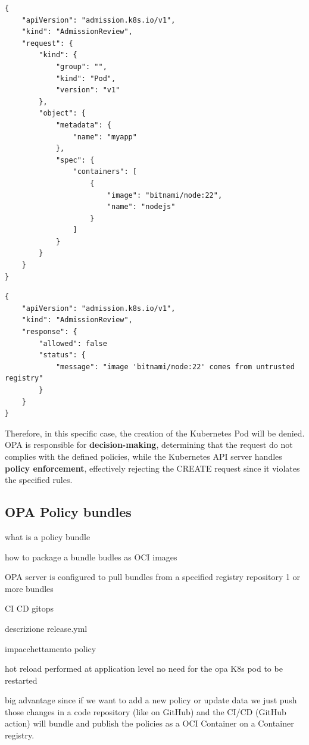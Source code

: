 \newpage
\lstset{style=jsonstyle}
\begin{lstlisting}[caption={AdmissionReview request}]
{
    "apiVersion": "admission.k8s.io/v1",
    "kind": "AdmissionReview",
    "request": {
        "kind": {
            "group": "",
            "kind": "Pod",
            "version": "v1"
        },
        "object": {
            "metadata": {
                "name": "myapp"
            },
            "spec": {
                "containers": [
                    {
                        "image": "bitnami/node:22",
                        "name": "nodejs"
                    }
                ]
            }
        }
    }
}
\end{lstlisting}


\lstset{style=jsonstyle}
\begin{lstlisting}[caption={AdmissionReview response}]
{
    "apiVersion": "admission.k8s.io/v1",
    "kind": "AdmissionReview",
    "response": {
        "allowed": false
        "status": {
            "message": "image 'bitnami/node:22' comes from untrusted registry"
        }
    }
}
\end{lstlisting}

Therefore, in this specific case, the creation of the Kubernetes Pod will be denied. OPA is responsible for \textbf{decision-making}, determining that the request do not complies with the defined policies, while the Kubernetes API server handles \textbf{policy enforcement}, effectively rejecting the CREATE request since it violates the specified rules.


\subsection{OPA Policy bundles}

what is a policy bundle

how to package a bundle
budles as OCI images

OPA server is configured to pull bundles from a specified registry repository
1 or more bundles

CI CD
gitops



descrizione release.yml

impacchettamento policy






hot reload performed at application level 
no need for the opa K8s pod to be restarted

big advantage since if we want to add a new policy or update data we just push those changes in a code repository (like on GitHub) and the CI/CD (GitHub action) will bundle and publish the policies as a OCI Container on a Container registry. \newpage


